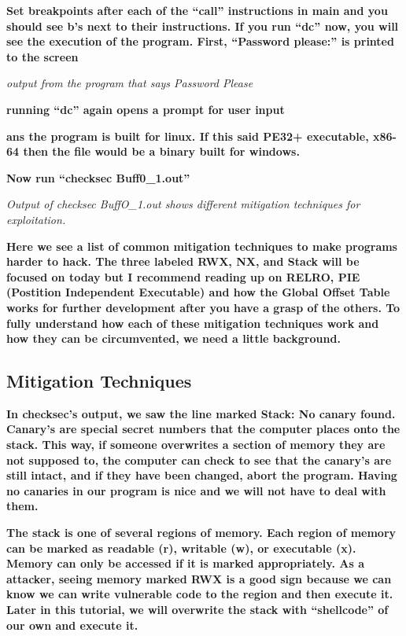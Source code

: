 \documentclass[letterpaper]{article}
\newcommand{\sitfig}[3]{
\begin{figure}[H]
\centering
\makebox[\textwidth][c]{
#2
}
\label{#1}
\end{figure}
}
\newcommand{\sitgfx}[4][scale=1.0]{
\sitfig{#3}{\texttt{[image: \#2]}}{#4}
}
\begin{document}
  
\sitgfx[width=5.8335in,height=3.6457in]{reversing-img081.png}{fig:unk}{TODO CAPTION}
 

\textbf{Set breakpoints after each of the ``call'' instructions in main and you should see b's next to their
instructions. If you run ``dc'' now, you will see the execution of the program. First, ``Password please:'' is printed
to the screen}

  
\sitgfx[width=5.8335in,height=3.6457in]{reversing-img082.png}{fig:unk}{TODO CAPTION}
 

\textit{output from the program that says Password Please}

\textbf{running ``dc'' again opens a prompt for user input}

\textbf{ans the program is built for linux. If this said PE32+ executable, x86-64 then the file would be a binary built
for windows.}

  
\sitgfx[width=5.8335in,height=0.9602in]{reversing-img074.png}{fig:unk}{TODO CAPTION}
 

\textbf{Now run ``checksec Buff0\_1.out''}  
\sitgfx[width=5.8335in,height=3.6457in]{reversing-img083.png}{fig:unk}{TODO CAPTION}
 

\textit{Output of checksec BuffO\_1.out shows different mitigation techniques for exploitation.}

\textbf{Here we see a list of common mitigation techniques to make programs harder to hack. The three labeled RWX, NX,
and Stack will be focused on today but I recommend reading up on RELRO, PIE (Postition Independent Executable) and how
the Global Offset Table works for further development after you have a grasp of the others. To fully understand how
each of these mitigation techniques work and how they can be circumvented, we need a little background.}

\subsection{Mitigation Techniques}

\textbf{In checksec's output, we saw the line marked Stack: No canary found. Canary's are special secret numbers that
the computer places onto the stack. This way, if someone overwrites a section of memory they are not supposed to, the
computer can check to see that the canary's are still intact, and if they have been changed, abort the program. Having
no canaries in our program is nice and we will not have to deal with them.}

\textbf{The stack is one of several regions of memory. Each region of memory can be marked as readable (r), writable
(w), or executable (x). Memory can only be accessed if it is marked appropriately. As a attacker, seeing memory marked
RWX is a good sign because we can know we can write vulnerable code to the region and then execute it. Later in this
tutorial, we will overwrite the stack with ``shellcode'' of our own and execute it.}
\end{document}
